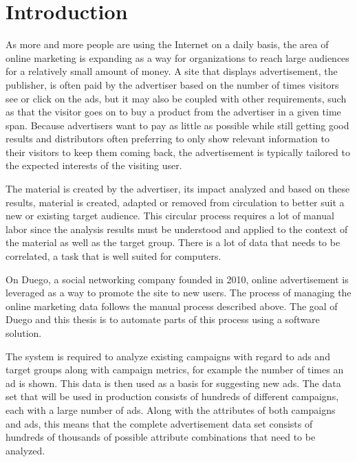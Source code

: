 \documentclass[11pt,a4paper]{report}
\begin{document}


\newpage
{}
\setcounter{page}{1}
\pagestyle{fancy}
\setspecialhdr
\tableofcontents

\newpage
\setdefaulthdr
{}
\setcounter{page}{1}

\chapter{Introduction}
As more and more people are using the Internet on a daily basis, the area of online marketing is expanding as a way for organizations to reach large audiences for a relatively small amount of money. A site that displays advertisement, the publisher, is often paid by the advertiser based on the number of times visitors see or click on the ads, but it may also be coupled with other requirements, such as that the visitor goes on to buy a product from the advertiser in a given time span. Because advertisers want to pay as little as possible while still getting good results and distributors often preferring to only show relevant information to their visitors to keep them coming back, the advertisement is typically tailored to the expected interests of the visiting user.

The material is created by the advertiser, its impact analyzed and based on these results, material is created, adapted or removed from circulation to better suit a new or existing target audience. This circular process requires a lot of manual labor since the analysis results must be understood and applied to the context of the material as well as the target group. There is a lot of data that needs to be correlated, a task that is well suited for computers.

On Duego, a social networking company founded in 2010, online advertisement is leveraged as a way to promote the site to new users. The process of managing the online marketing data follows the manual process described above. The goal of Duego and this thesis is to automate parts of this process using a software solution.

The system is required to analyze existing campaigns with regard to ads and target groups along with campaign metrics, for example the number of times an ad is shown. This data is then used as a basis for suggesting new ads. The data set that will be used in production consists of hundreds of different campaigns, each with a large number of ads. Along with the attributes of both campaigns and ads, this means that the complete advertisement data set consists of hundreds of thousands of possible attribute combinations that need to be analyzed.
\end{document}
